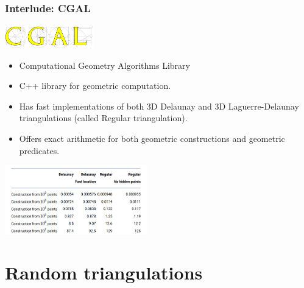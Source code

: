 \documentclass[c, 10pt]{beamer}
\begin{document}
\begin{frame}\frametitle{Interlude: CGAL}

\begin{center}
\includegraphics[height = 1cm]{./FigureLayout/cgal.png}
\end{center}

\begin{itemize}
\item Computational Geometry Algorithms Library
\item C++ library for geometric computation.
\item Has fast implementations of both 3D Delaunay and 3D Laguerre-Delaunay triangulations (called Regular triangulation).
\item Offers exact arithmetic for both geometric constructions and geometric predicates.
\end{itemize}


\begin{center}
\includegraphics[height = 3cm]{./FigureLayout/cgaltable.png}
\end{center}

\end{frame}




\section{Random triangulations}
\framesection{}
\end{document}
